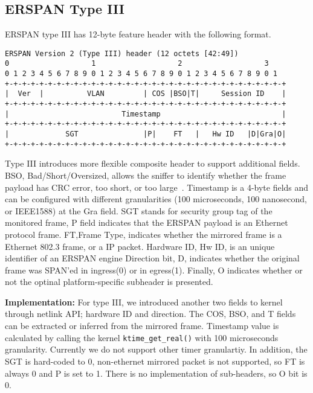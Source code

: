 \documentclass{sigplanconf}
\begin{document}
\subsection{ERSPAN Type III}
ERSPAN type III has 12-byte feature header with the following format.
{\scriptsize
\begin{verbatim}
ERSPAN Version 2 (Type III) header (12 octets [42:49])
0                   1                   2                   3
0 1 2 3 4 5 6 7 8 9 0 1 2 3 4 5 6 7 8 9 0 1 2 3 4 5 6 7 8 9 0 1
+-+-+-+-+-+-+-+-+-+-+-+-+-+-+-+-+-+-+-+-+-+-+-+-+-+-+-+-+-+-+-+-+
|  Ver  |          VLAN         | COS |BSO|T|     Session ID    |
+-+-+-+-+-+-+-+-+-+-+-+-+-+-+-+-+-+-+-+-+-+-+-+-+-+-+-+-+-+-+-+-+
|                          Timestamp                            |
+-+-+-+-+-+-+-+-+-+-+-+-+-+-+-+-+-+-+-+-+-+-+-+-+-+-+-+-+-+-+-+-+
|             SGT               |P|    FT   |   Hw ID   |D|Gra|O|
+-+-+-+-+-+-+-+-+-+-+-+-+-+-+-+-+-+-+-+-+-+-+-+-+-+-+-+-+-+-+-+-+
\end{verbatim}
}
Type III introduces more flexible composite header to support additional
fields.  BSO, Bad/Short/Oversized, allows the sniffer to identify whether
the frame payload has CRC error, too short, or too large~\cite{bso}.
Timestamp is a 4-byte fields and can be configured with different granularities
(100 microseconds, 100 nanosecond, or IEEE1588) at the Gra field.
SGT stands for security group tag of the monitored frame, P field
indicates that the ERSPAN payload is an Ethernet protocol frame.
FT,Frame Type, indicates whether the mirrored frame is a Ethernet
802.3 frame, or a IP packet.
Hardware ID, Hw ID, is an unique identifier of an ERSPAN engine
Direction bit, D, indicates whether the original frame was
SPAN'ed in ingress(0) or in egress(1).
Finally, O indicates whether or not the optinal platform-specific
subheader is presented.

\textbf{Implementation: }
For type III, we introduced another two fields to kernel through
netlink API; hardware ID and direction.
The COS, BSO, and T fields can be extracted or inferred from the mirrored
frame. Timestamp value is calculated by calling the kernel
\texttt{ktime\_get\_real()} with 100 microseconds granularity.
Currently we do not support other timer granulartiy.
In addition, the SGT is hard-coded to 0, non-ethernet mirrored packet
is not supported, so FT is always 0 and P is set to 1.
There is no implementation of sub-headers, so O bit is 0.
\end{document}
